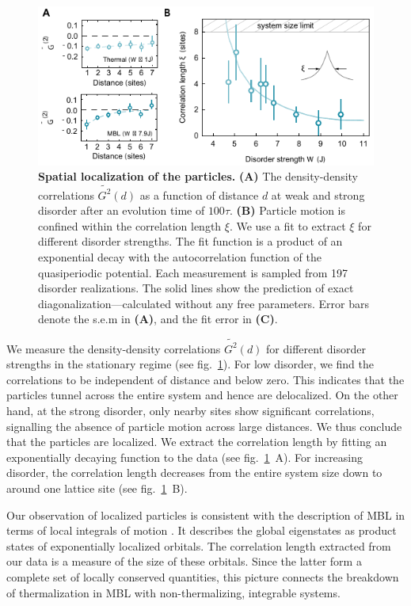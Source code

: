\begin{figure}[t]
	\centering
	\includegraphics{figures/MBL_localization.pdf}
	\caption{{\bf Spatial localization of the particles.} {\bf{(A)}} The density-density correlations $\widetilde{G^{2}}(d)$ as a function of distance $d$ at weak and strong disorder after an evolution time of $100\tau$. {\bf (B)} Particle motion is confined within the correlation length $\xi$. We use a fit to extract $\xi$ for different disorder strengths. The fit function is a product of an exponential decay with the autocorrelation function of the quasiperiodic potential. Each measurement is sampled from 197 disorder realizations. The solid lines show the prediction of exact diagonalization---calculated without any free parameters. Error bars denote the s.e.m in {\bf (A)}, and the fit error in {\bf (C)}.}
	\label{fig:MBL_localization}
\end{figure}

We measure the density-density correlations $\widetilde{G^{2}}(d)$ for different disorder strengths in the stationary regime (see fig.~\ref{fig:MBL_localization}). For low disorder, we find the correlations to be independent of distance and below zero. This indicates that the particles tunnel across the entire system and hence are delocalized. On the other hand, at the strong disorder, only nearby sites show significant correlations, signalling the absence of particle motion across large distances. We thus conclude that the particles are localized. We extract the correlation length by fitting an exponentially decaying function to the data (see fig.~\ref{fig:MBL_localization}~A). For increasing disorder, the correlation length decreases from the entire system size down to around one lattice site (see fig.~\ref{fig:MBL_localization}~B). 

Our observation of localized particles is consistent with the description of MBL in terms of local integrals of motion \cite{Serbyn2013, Serbyn2013a, Huse2014}. It describes the global eigenstates as product states of exponentially localized orbitals. The correlation length extracted from our data is a measure of the size of these orbitals. Since the latter form a complete set of locally conserved quantities, this picture connects the breakdown of thermalization in MBL with non-thermalizing, integrable systems. 

